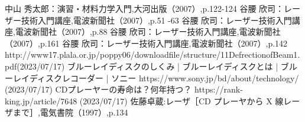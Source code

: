 \documentclass[a4paper,11pt]{jsarticle}
\begin{document}
\begin{thebibliography}{20}
  \bibitem{}
  中山 秀太郎：演習・材料力学入門,大河出版（2007）,p.122-124
  \bibitem{}
  谷腰 欣司：レーザー技術入門講座,電波新聞社（2007）,p.51 -63
  \bibitem{}
  谷腰 欣司：レーザー技術入門講座,電波新聞社（2007）,p.88
  \bibitem{}
  谷腰 欣司：レーザー技術入門講座,電波新聞社（2007）,p.161
  \bibitem{}
  谷腰 欣司：レーザー技術入門講座,電波新聞社（2007）,p.142
  \bibitem{}
  http://www17.plala.or.jp/poppy06/downloadfile/structure/11DefrectionofBeam1.pdf(2023/07/17)
  \bibitem{}
  ブルーレイディスクのしくみ | ブルーレイディスクとは | ブルーレイディスクレコーダー | ソニー https://www.sony.jp/bd/about/technology/ (2023/07/17)
  \bibitem{}
  CDプレーヤーの寿命は？何年持つ？ https://rank-king.jp/article/7648 (2023/07/17)
  \bibitem{}
  佐藤卓蔵:レーザ［CD プレーヤから X 線レーザまで］,電気書院（1997）,p.134
\end{thebibliography}
\end{document}
